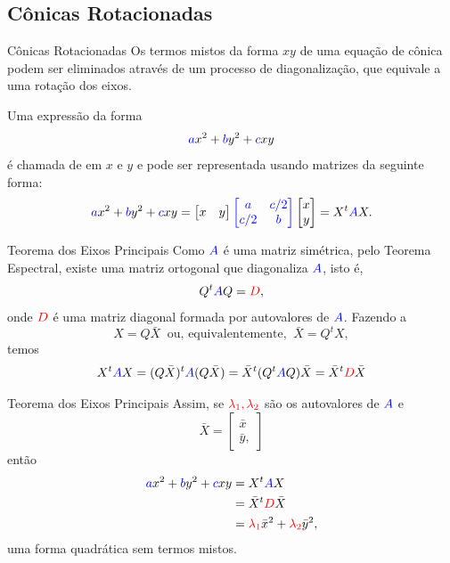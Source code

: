 
\subsection*{Cônicas Rotacionadas}

\begin{frame}[label=conicas]{Cônicas Rotacionadas}
Os termos mistos da forma $xy$ de uma equação de cônica podem ser 
eliminados através de um processo de diagonalização, que equivale a uma 
rotação dos eixos.
\medskip

Uma expressão da forma
\[{\color{blue}a}x^2+{\color{blue}b}y^2+{\color{blue}c}xy\]
é chamada de  em $x$ e $y$ e pode ser representada 
usando matrizes da seguinte forma:
\[{\color{blue}a}x^2+{\color{blue}b}y^2+{\color{blue}c}xy=
\begin{bmatrix}
x & y
\end{bmatrix}
{\color{blue}\begin{bmatrix}
a & c/2\\ c/2 & b
\end{bmatrix}}
\begin{bmatrix}
x \\ y
\end{bmatrix}= X^t {\color{blue}A} X.
\]

\end{frame}


\begin{frame}[label=conicas]{Teorema dos Eixos Principais}
Como ${\color{blue}A}$ é uma matriz simétrica, pelo Teorema Espectral, 
existe uma matriz ortogonal que diagonaliza ${\color{blue}A}$, isto é, 
\[Q^t {\color{blue}A} Q={\color{red}D},\]
onde ${\color{red}D}$ é uma matriz diagonal formada por autovalores de 
${\color{blue}A}$.
Fazendo a  
\[X=Q\bar{X}\ \text{ ou, equivalentemente, }\  \bar{X}=Q^tX,\]
temos
\begin{equation*}
X^t {\color{blue}A} X
=(Q\bar{X})^t {\color{blue}A}(Q\bar{X})
=\bar{X}^t(Q^t {\color{blue}A}Q) \bar{X}
=\bar{X}^t{\color{red}D}\bar{X}
\end{equation*}



\end{frame}

\begin{frame}[label=conicas]{Teorema dos Eixos Principais}
Assim, se ${\color{red}\lambda_1,\lambda_2}$ são os autovalores de ${\color{blue}A}$ e 
\[\bar{X}=
\begin{bmatrix}
\bar{x} \\ \bar{y},
\end{bmatrix}\]
então
\begin{align*}
{\color{blue}a}x^2+{\color{blue}b}y^2+{\color{blue}c}xy& =X^t {\color{blue}A} X\\
& =\bar{X}^t{\color{red}D}\bar{X}\\
& = {\color{red}\lambda_1}\bar{x}^2+{\color{red}\lambda_2}\bar{y}^2,
\end{align*}
uma forma quadrática sem termos mistos.

\end{frame}


